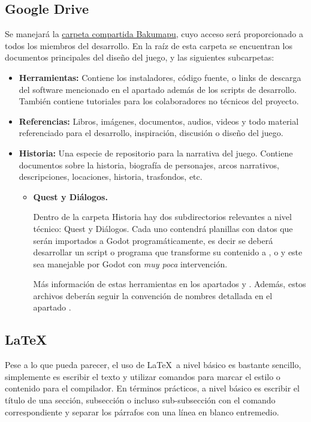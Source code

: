\subsection{Google Drive}\label{flujo:google-drive}
Se manejará la \href{https://drive.google.com/open?id=1p8u-1UpXts8OHGRHEZLSIiQrqqx0Y4Kt}{carpeta compartida Bakumapu}, cuyo acceso será proporcionado a todos los miembros del desarrollo. En la raíz de esta carpeta se encuentran los documentos principales del diseño del juego, y las siguientes subcarpetas:
\begin{itemize}
	\item \textbf{Herramientas:} Contiene los instaladores, código fuente, o links de descarga del software mencionado en el apartado  además de los scripts de desarrollo. También contiene tutoriales para los colaboradores no técnicos del proyecto.
	\item \textbf{Referencias:} Libros, imágenes, documentos, audios, videos y todo material referenciado para el desarrollo, inspiración, discusión o diseño del juego.
	\item \textbf{Historia:} Una especie de repositorio para la narrativa del juego. Contiene documentos sobre la historia, biografía de personajes, arcos narrativos, descripciones, locaciones, historia, trasfondos, etc.
	\begin{itemize}
		\item \textbf{Quest y Diálogos.}
		
		Dentro de la carpeta Historia hay dos subdirectorios relevantes a nivel técnico: Quest y Diálogos. Cada uno contendrá planillas con datos que serán importados a Godot programáticamente, es decir se deberá desarrollar un script o programa que transforme su contenido a ,  o  y este sea manejable por Godot con \emph{muy poca} intervención.
		
		Más información de estas herramientas en los apartados  y . Además, estos archivos deberán seguir la convención de nombres detallada en el apartado .
	\end{itemize}
\end{itemize}


\subsection{LaTeX}\label{flujo:latex}
Pese a lo que pueda parecer, el uso de \LaTeX\ a nivel básico es bastante sencillo, simplemente es escribir el texto y utilizar comandos para marcar el estilo o contenido para el compilador. En términos prácticos, a nivel básico es escribir el título de una sección, subsección o incluso sub-subsección con el comando correspondiente y separar los párrafos con una línea en blanco entremedio.

